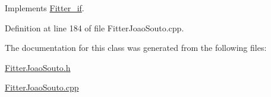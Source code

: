 Implements \hyperlink{class_fitter__if_aa2d2f13548a09a2f727a4190a6b9c2dd}{Fitter\-\_\-if}.



Definition at line 184 of file Fitter\-Joao\-Souto.\-cpp.



The documentation for this class was generated from the following files\-:\begin{DoxyCompactItemize}
\item 
\hyperlink{_fitter_joao_souto_8h}{Fitter\-Joao\-Souto.\-h}\item 
\hyperlink{_fitter_joao_souto_8cpp}{Fitter\-Joao\-Souto.\-cpp}\end{DoxyCompactItemize}
